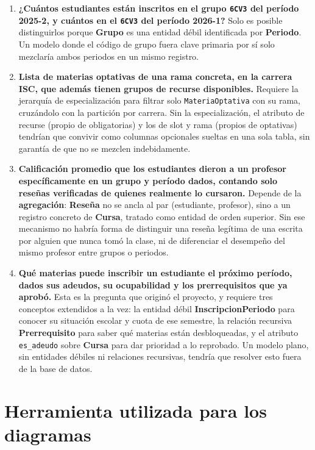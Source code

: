 \documentclass[11pt,letterpaper]{article}
\begin{document}
\begin{enumerate}
  \item \textbf{¿Cuántos estudiantes están inscritos en el grupo \texttt{6CV3} del período 2025-2, y cuántos en el \texttt{6CV3} del período 2026-1?} Solo es posible distinguirlos porque \textbf{Grupo} es una entidad débil identificada por \textbf{Periodo}. Un modelo donde el código de grupo fuera clave primaria por sí solo mezclaría ambos periodos en un mismo registro.

  \item \textbf{Lista de materias optativas de una rama concreta, en la carrera ISC, que además tienen grupos de recurse disponibles.} Requiere la jerarquía de especialización para filtrar solo \texttt{MateriaOptativa} con su rama, cruzándolo con la partición por carrera. Sin la especialización, el atributo de recurse (propio de obligatorias) y los de slot y rama (propios de optativas) tendrían que convivir como columnas opcionales sueltas en una sola tabla, sin garantía de que no se mezclen indebidamente.

  \item \textbf{Calificación promedio que los estudiantes dieron a un profesor específicamente en un grupo y período dados, contando solo reseñas verificadas de quienes realmente lo cursaron.} Depende de la \textbf{agregación}: \textbf{Reseña} no se ancla al par (estudiante, profesor), sino a un registro concreto de \textbf{Cursa}, tratado como entidad de orden superior. Sin ese mecanismo no habría forma de distinguir una reseña legítima de una escrita por alguien que nunca tomó la clase, ni de diferenciar el desempeño del mismo profesor entre grupos o periodos.

  \item \textbf{Qué materias puede inscribir un estudiante el próximo período, dados sus adeudos, su ocupabilidad y los prerrequisitos que ya aprobó.} Esta es la pregunta que originó el proyecto, y requiere tres conceptos extendidos a la vez: la entidad débil \textbf{InscripcionPeriodo} para conocer su situación escolar y cuota de ese semestre, la relación recursiva \textbf{Prerrequisito} para saber qué materias están desbloqueadas, y el atributo \texttt{es\_adeudo} sobre \textbf{Cursa} para dar prioridad a lo reprobado. Un modelo plano, sin entidades débiles ni relaciones recursivas, tendría que resolver esto fuera de la base de datos.
\end{enumerate}

\section{Herramienta utilizada para los diagramas}
\end{document}
